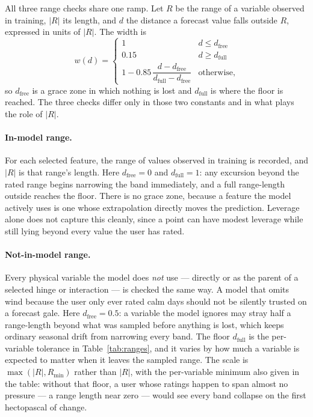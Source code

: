 \documentclass[11pt]{article}
\begin{document}
All three range checks share one ramp. Let $R$ be the range of a variable
observed in training, $|R|$ its length, and $d$ the distance a forecast value
falls outside $R$, expressed in units of $|R|$. The width is
\begin{equation}
w(d) = \begin{cases}
1 & d \leq d_{\text{free}} \\
0.15 & d \geq d_{\text{full}} \\
1 - 0.85\,\dfrac{d - d_{\text{free}}}{d_{\text{full}} - d_{\text{free}}}
  & \text{otherwise,}
\end{cases}
\end{equation}
so $d_{\text{free}}$ is a grace zone in which nothing is lost and
$d_{\text{full}}$ is where the floor is reached. The three checks differ only
in those two constants and in what plays the role of $|R|$.

\paragraph{In-model range.} For each selected feature, the range of values
observed in training is recorded, and $|R|$ is that range's length. Here
$d_{\text{free}} = 0$ and $d_{\text{full}} = 1$: any excursion beyond the
rated range begins narrowing the band immediately, and a full range-length
outside reaches the floor. There is no grace zone, because a feature the model
actively uses is one whose extrapolation directly moves the prediction.
Leverage alone does not capture this cleanly, since a point can have modest
leverage while still lying beyond every value the user has rated.

\paragraph{Not-in-model range.} Every physical variable the model does
\emph{not} use --- directly or as the parent of a selected hinge or
interaction --- is checked the same way. A model that omits wind because the
user only ever rated calm days should not be silently trusted on a forecast
gale. Here $d_{\text{free}} = 0.5$: a variable the model ignores may stray
half a range-length beyond what was sampled before anything is lost, which
keeps ordinary seasonal drift from narrowing every band. The floor
$d_{\text{full}}$ is the per-variable tolerance in Table~\ref{tab:ranges},
and it varies by how much a variable is expected to matter when it leaves the
sampled range. The scale is $\max(|R|, R_{\min})$ rather than $|R|$, with the
per-variable minimum also given in the table: without that floor, a user whose
ratings happen to span almost no pressure --- a range length near zero --- would
see every band collapse on the first hectopascal of change.
\end{document}
